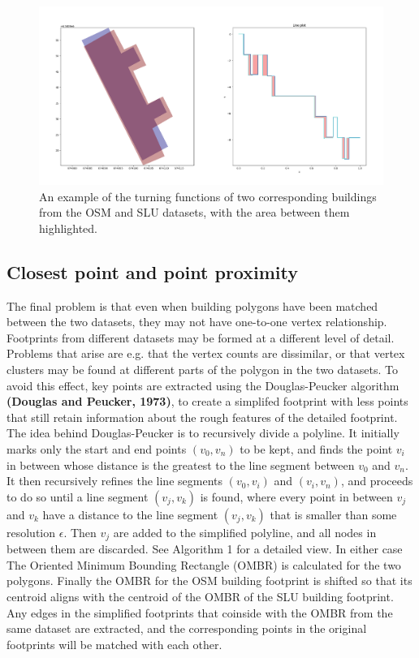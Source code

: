 \documentclass{kththesis}
\begin{document}
\begin{figure}[H]
    \centering
    \includegraphics[width=\textwidth,height=0.5\textheight,keepaspectratio]{img_turn_function_diff_filled}
    \caption{An example of the turning functions of two corresponding buildings from the OSM and SLU datasets, with the area between them highlighted.}
    \label{fig:turning-function-compare}
\end{figure}

\subsection{Closest point and point proximity}

The final problem is that even when building polygons have been matched between the two datasets, they may not have one-to-one vertex relationship.
Footprints from different datasets may be formed at a different level of detail.
Problems that arise are e.g. that the vertex counts are dissimilar, or that vertex clusters may be found at different parts of the polygon in the two datasets.
To avoid this effect, key points are extracted using the Douglas-Peucker algorithm \textbf{(Douglas and Peucker, 1973)}, to create a simplifed footprint with less points that still retain information about the rough features of the detailed footprint.
The idea behind Douglas-Peucker is to recursively divide a polyline.
It initially marks only the start and end points $(v_0, v_n)$ to be kept, and finds the point $v_i$ in between whose distance is the greatest to the line segment between $v_0$ and $v_n$.
It then recursively refines the line segments $(v_0, v_i)$ and $(v_i, v_n)$, and proceeds to do so until a line segment $(v_j, v_k)$ is found, where every point in between $v_j$ and $v_k$ have a distance to the line segment $(v_j, v_k)$ that is smaller than some resolution $\epsilon$.
Then $v_j$ are added to the simplified polyline, and all nodes in between them are discarded.
See Algorithm 1 for a detailed view.
In either case The Oriented Minimum Bounding Rectangle (OMBR) is calculated for the two polygons.
Finally the OMBR for the OSM building footprint is shifted so that its centroid aligns with the centroid of the OMBR of the SLU building footprint.
Any edges in the simplified footprints that coinside with the OMBR from the same dataset are extracted, and the corresponding points in the original footprints will be matched with each other.
\end{document}
